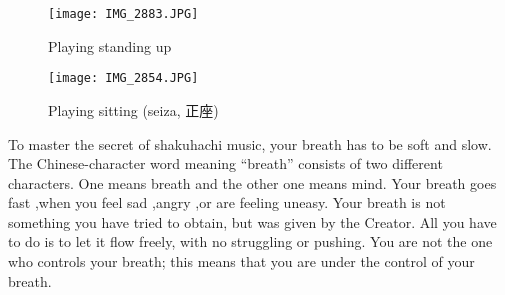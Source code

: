 ﻿\begin{figure}
\centering
\begin{minipage}{0.4\textwidth}
\centering
\texttt{[image: IMG\_2883.JPG]}
\caption{Playing standing up} \label{fig:standing}
\end{minipage}
\hfill
\begin{minipage}{0.4\textwidth}
\centering
\texttt{[image: IMG\_2854.JPG]}
\caption{Playing sitting (seiza, 正座)} \label{fig:sitting}
\end{minipage}
\end{figure}

To master the secret of shakuhachi music, your breath has to be soft and slow.
The Chinese-character word meaning “breath” consists of two different characters.
One means breath and the other one means mind.
Your breath goes fast ,when you feel sad ,angry ,or are feeling uneasy.
Your breath is not something you have tried to obtain, but was given by the Creator.
All you have to do is to let it flow freely, with no struggling or pushing.
You are not the one who controls your breath; this means that you are under the control of your breath.


